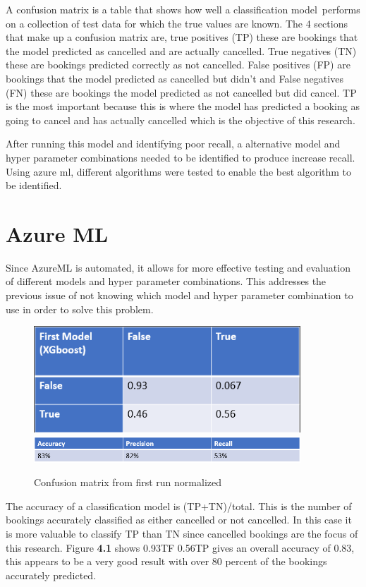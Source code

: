 A confusion matrix is a table that shows how well a classification model performs on a collection of test data for which the true values are known. The 4 sections that make up a confusion matrix are, true positives (TP) these are bookings that the model predicted as cancelled and are actually cancelled. True negatives (TN) these are bookings predicted correctly as not cancelled. False positives (FP) are bookings that the model predicted as cancelled but didn't and False negatives (FN) these are bookings the model predicted as not cancelled but did cancel. TP is the most important because this is where the model has predicted a booking as going  to cancel and has actually cancelled which is the objective of this research.

After running this model and identifying poor recall, a alternative model and hyper parameter combinations needed to be identified to produce increase recall. Using azure ml, different algorithms were tested to enable the best algorithm to be identified. 

\section{Azure ML}
Since AzureML is automated, it allows for more effective testing and evaluation of different models and hyper parameter combinations. This addresses the previous issue of not knowing which model and hyper parameter combination to use in order to solve this problem.

\begin{figure}[H]
 \includegraphics[width=10cm]{figures/xgboost_confusion_matrix.png}
 \includegraphics[width=10cm]{figures/original_results.png}
 \caption{Confusion matrix from first run normalized}
\end{figure}

The accuracy of a classification model is (TP+TN)/total. This is the number of bookings accurately classified as either cancelled or not cancelled. In this case it is more valuable to classify TP than TN since cancelled bookings are the focus of this research. Figure \textbf{4.1} shows  0.93TF 0.56TP gives an overall accuracy of 0.83, this appears to be a very good result with over 80 percent of the bookings accurately predicted.

